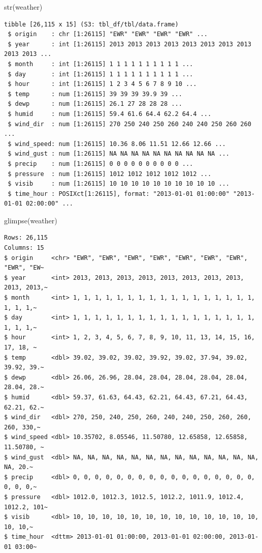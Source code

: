 \documentclass[
  10pt,
  letterpaper,
  DIV=11,
  numbers=noendperiod]{scrartcl}
\newenvironment{Shaded}{\begin{snugshade}}{\end{snugshade}}
\newcommand{\FunctionTok}[1]{\textcolor[rgb]{0.28,0.35,0.67}{#1}}
\newcommand{\NormalTok}[1]{\textcolor[rgb]{0.00,0.23,0.31}{#1}}
\begin{document}
\begin{Shaded}
\begin{Highlighting}[numbers=left,,]
\FunctionTok{str}\NormalTok{(weather)}
\end{Highlighting}
\end{Shaded}

\begin{verbatim}
tibble [26,115 x 15] (S3: tbl_df/tbl/data.frame)
 $ origin    : chr [1:26115] "EWR" "EWR" "EWR" "EWR" ...
 $ year      : int [1:26115] 2013 2013 2013 2013 2013 2013 2013 2013 2013 2013 ...
 $ month     : int [1:26115] 1 1 1 1 1 1 1 1 1 1 ...
 $ day       : int [1:26115] 1 1 1 1 1 1 1 1 1 1 ...
 $ hour      : int [1:26115] 1 2 3 4 5 6 7 8 9 10 ...
 $ temp      : num [1:26115] 39 39 39 39.9 39 ...
 $ dewp      : num [1:26115] 26.1 27 28 28 28 ...
 $ humid     : num [1:26115] 59.4 61.6 64.4 62.2 64.4 ...
 $ wind_dir  : num [1:26115] 270 250 240 250 260 240 240 250 260 260 ...
 $ wind_speed: num [1:26115] 10.36 8.06 11.51 12.66 12.66 ...
 $ wind_gust : num [1:26115] NA NA NA NA NA NA NA NA NA NA ...
 $ precip    : num [1:26115] 0 0 0 0 0 0 0 0 0 0 ...
 $ pressure  : num [1:26115] 1012 1012 1012 1012 1012 ...
 $ visib     : num [1:26115] 10 10 10 10 10 10 10 10 10 10 ...
 $ time_hour : POSIXct[1:26115], format: "2013-01-01 01:00:00" "2013-01-01 02:00:00" ...
\end{verbatim}

\begin{Shaded}
\begin{Highlighting}[numbers=left,,]
\FunctionTok{glimpse}\NormalTok{(weather)}
\end{Highlighting}
\end{Shaded}

\begin{verbatim}
Rows: 26,115
Columns: 15
$ origin     <chr> "EWR", "EWR", "EWR", "EWR", "EWR", "EWR", "EWR", "EWR", "EW~
$ year       <int> 2013, 2013, 2013, 2013, 2013, 2013, 2013, 2013, 2013, 2013,~
$ month      <int> 1, 1, 1, 1, 1, 1, 1, 1, 1, 1, 1, 1, 1, 1, 1, 1, 1, 1, 1, 1,~
$ day        <int> 1, 1, 1, 1, 1, 1, 1, 1, 1, 1, 1, 1, 1, 1, 1, 1, 1, 1, 1, 1,~
$ hour       <int> 1, 2, 3, 4, 5, 6, 7, 8, 9, 10, 11, 13, 14, 15, 16, 17, 18, ~
$ temp       <dbl> 39.02, 39.02, 39.02, 39.92, 39.02, 37.94, 39.02, 39.92, 39.~
$ dewp       <dbl> 26.06, 26.96, 28.04, 28.04, 28.04, 28.04, 28.04, 28.04, 28.~
$ humid      <dbl> 59.37, 61.63, 64.43, 62.21, 64.43, 67.21, 64.43, 62.21, 62.~
$ wind_dir   <dbl> 270, 250, 240, 250, 260, 240, 240, 250, 260, 260, 260, 330,~
$ wind_speed <dbl> 10.35702, 8.05546, 11.50780, 12.65858, 12.65858, 11.50780, ~
$ wind_gust  <dbl> NA, NA, NA, NA, NA, NA, NA, NA, NA, NA, NA, NA, NA, NA, 20.~
$ precip     <dbl> 0, 0, 0, 0, 0, 0, 0, 0, 0, 0, 0, 0, 0, 0, 0, 0, 0, 0, 0, 0,~
$ pressure   <dbl> 1012.0, 1012.3, 1012.5, 1012.2, 1011.9, 1012.4, 1012.2, 101~
$ visib      <dbl> 10, 10, 10, 10, 10, 10, 10, 10, 10, 10, 10, 10, 10, 10, 10,~
$ time_hour  <dttm> 2013-01-01 01:00:00, 2013-01-01 02:00:00, 2013-01-01 03:00~
\end{verbatim}
\end{document}
